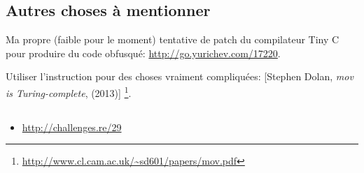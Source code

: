 \subsection{Autres choses à mentionner}

Ma propre (faible pour le moment) tentative de patch du compilateur Tiny C pour
produire du code obfusqué: \url{http://go.yurichev.com/17220}.

Utiliser l'instruction \MOV pour des choses vraiment compliquées:
[Stephen Dolan, \emph{mov is Turing-complete}, (2013)]
\footnote{\AlsoAvailableAs \url{http://www.cl.cam.ac.uk/~sd601/papers/mov.pdf}}. 

\subsection{\Exercise}

\begin{itemize}
	\item \url{http://challenges.re/29}
\end{itemize}

